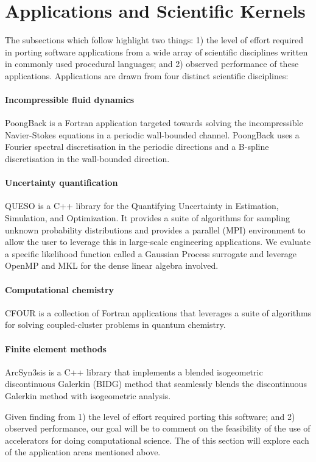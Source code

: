 \section{Applications and Scientific Kernels}
\label{sec:apps}

The subsections which follow highlight two things: 1) the level of effort
required in porting software applications from a wide array of scientific
disciplines written in commonly used procedural languages; and 2) observed
performance of these applications.  Applications are drawn from four distinct
scientific disciplines:

\paragraph{Incompressible fluid dynamics}  PoongBack is a Fortran application
targeted towards solving the incompressible Navier-Stokes equations in a
periodic wall-bounded channel.  PoongBack uses a Fourier spectral
discretisation in the periodic directions and a B-spline discretisation in the
wall-bounded direction.

\paragraph{Uncertainty quantification}  QUESO is a C++ library for the
Quantifying Uncertainty in Estimation, Simulation, and Optimization.  It
provides a suite of algorithms for sampling unknown probability distributions
and provides a parallel (MPI) environment to allow the user to leverage this in
large-scale engineering applications.  We evaluate a specific likelihood
function called a Gaussian Process surrogate and leverage OpenMP and MKL for
the dense linear algebra involved.

\paragraph{Computational chemistry}  CFOUR is a collection of Fortran
applications that leverages a suite of algorithms for solving coupled-cluster
problems in quantum chemistry.

\paragraph{Finite element methods}  ArcSyn3sis is a C++ library that implements
a blended isogeometric discontinuous Galerkin (BIDG) method that seamlessly
blends the discontinuous Galerkin method with isogeometric analysis.

Given finding from 1) the level of effort required porting this software; and
2) observed performance, our goal will be to comment on the feasibility of the
use of accelerators for doing computational science.  The of this section will
explore each of the application areas mentioned above.
